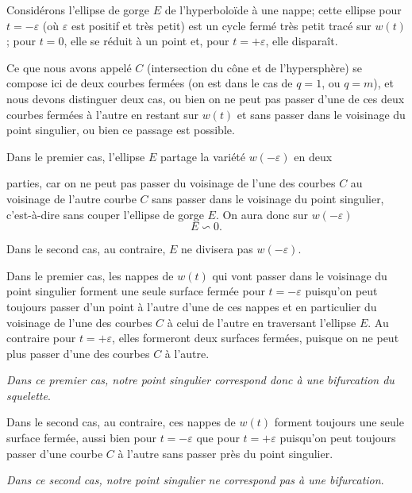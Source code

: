 \documentclass{article}
\begin{document}
Considérons l'ellipse de gorge $E$ de l'hyperboloïde à une nappe; cette ellipse pour $t = -\varepsilon$ (où $\varepsilon$ est positif et très petit) est un cycle fermé très petit tracé sur $w(t)$; pour $t = 0$, elle se réduit à un point et, pour $t = +\varepsilon$, elle disparaît.

Ce que nous avons appelé $C$ (intersection du cône et de l'hypersphère) se compose ici de deux courbes fermées (on est dans le cas de $q = 1$, ou $q = m$), et nous devons distinguer deux cas, ou bien on ne peut pas passer d'une de ces deux courbes fermées à l'autre en restant sur $w(t)$ et sans passer dans le voisinage du point singulier, ou bien ce passage est possible.

Dans le premier cas, l'ellipse $E$ partage la variété $w(-\varepsilon)$ en deux

parties, car on ne peut pas passer du voisinage de l'une des courbes $C$ au voisinage de l'autre courbe $C$ sans passer dans le voisinage du point singulier, c'est-à-dire sans couper l'ellipse de gorge $E$. On aura donc sur $w(-\varepsilon)$
\[ E \backsim 0. \]

Dans le second cas, au contraire, $E$ ne divisera pas $w(-\varepsilon)$.

Dans le premier cas, les nappes de $w(t)$ qui vont passer dans le voisinage du point singulier forment une seule surface fermée pour $t = -\varepsilon$ puisqu'on peut toujours passer d'un point à l'autre d'une de ces nappes et en particulier du voisinage de l'une des courbes $C$ à celui de l'autre en traversant l'ellipse $E$. Au contraire pour $t = +\varepsilon$, elles formeront deux surfaces fermées, puisque on ne peut plus passer d'une des courbes $C$ à l'autre.

\emph{Dans ce premier cas, notre point singulier correspond donc à une bifurcation du squelette}.

Dans le second cas, au contraire, ces nappes de $w(t)$ forment toujours une seule surface fermée, aussi bien pour $t = -\varepsilon$ que pour $t = +\varepsilon$ puisqu'on peut toujours passer d'une courbe $C$ à l'autre sans passer près du point singulier.

\emph{Dans ce second cas, notre point singulier ne correspond pas à une bifurcation}.
\end{document}
